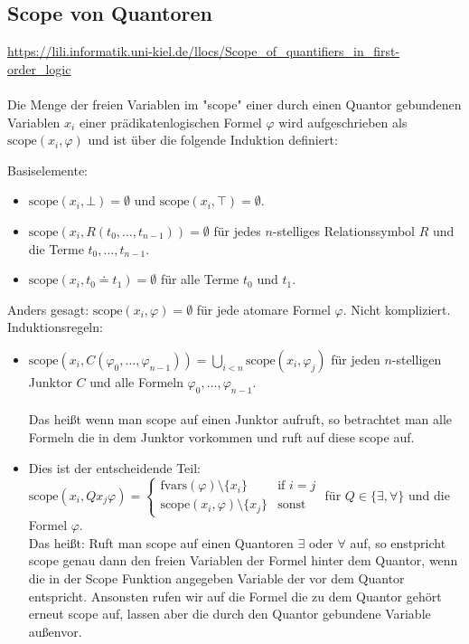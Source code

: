 \documentclass{article}
\begin{document}
    \subsection{Scope von Quantoren}
    \url{https://lili.informatik.uni-kiel.de/llocs/Scope_of_quantifiers_in_first-order_logic}\\\\
    Die Menge der freien Variablen im "scope" einer durch einen Quantor gebundenen Variablen $x_i$ einer prädikatenlogischen Formel $\varphi$ wird aufgeschrieben als $\text{scope}(x_i, \varphi)$ und ist über die folgende Induktion definiert:

    Basiselemente:
    \begin{itemize}
        \item $\text{scope}(x_i, \bot) = \emptyset$ und $\text{scope}(x_i, \top) = \emptyset$.
        \item $\text{scope}(x_i, R(t_0, \dots, t_{n-1})) = \emptyset$ für jedes $n$-stelliges Relationssymbol $R$ und die Terme $t_0, \dots, t_{n-1}$.
        \item $\text{scope}(x_i, t_0 \doteq t_1) = \emptyset$ für alle Terme $t_0$ und $t_1$.
    \end{itemize}
    Anders gesagt: $\text{scope}(x_i, \varphi) = \emptyset$ für jede atomare Formel $\varphi$. Nicht kompliziert.\\

    Induktionsregeln:
    \begin{itemize}
        \item $\text{scope}(x_i, C(\varphi_0, \dots, \varphi_{n-1})) = \bigcup_{i<n} \text{scope}(x_i, \varphi_j)$ für jeden $n$-stelligen Junktor $C$ und alle Formeln $\varphi_0, \dots, \varphi_{n-1}$.\\\\
            Das heißt wenn man scope auf einen Junktor aufruft, so betrachtet man alle Formeln die in dem Junktor vorkommen und ruft auf diese scope auf.
        \item 
            Dies ist der entscheidende Teil:\\
            $\text{scope}(x_i, Q x_j \varphi) = \begin{cases}\text{fvars}(\varphi) \setminus \{x_i\} & \text{if $i = j$}\\ \text{scope}(x_i, \varphi) \setminus \{x_j\} & \text{sonst}\end{cases}$ für $Q \in \{\exists, \forall\}$ und die Formel $\varphi$.\\
            Das heißt: Ruft man scope auf einen Quantoren $\exists$ oder $\forall$ auf, so enstpricht scope genau dann den freien Variablen der Formel hinter dem Quantor, wenn die in der Scope Funktion angegeben Variable der vor dem Quantor entspricht. Ansonsten rufen wir auf die Formel die zu dem Quantor gehört erneut scope auf, lassen aber die durch den Quantor gebundene Variable außenvor.  
    \end{itemize}
\end{document}
